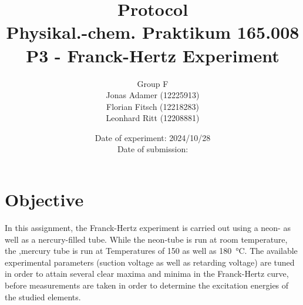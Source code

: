 \documentclass[titlepage]{article}
\title{Protocol \\ Physikal.-chem. Praktikum 165.008 \\ P3 - Franck-Hertz Experiment}
\author{Group F\\Jonas Adamer (12225913)\\Florian Fitsch (12218283)\\Leonhard Ritt (12208881)}
\date{Date of experiment: 2024/10/28\\Date of submission:}
\begin{document}
\maketitle
\thispagestyle{empty}

\newpage
\tableofcontents
\thispagestyle{empty}

\addtocounter{page}{-1}

\newpage
\section{Objective}
In this assignment, the Franck-Hertz experiment is carried out using a neon- as well as a nercury-filled tube. While the neon-tube is run at room temperature, the ,mercury tube is run at Temperatures of 150 as well as 180~°C. The available experimental parameters (suction voltage as well as retarding voltage) are tuned in order to attain several clear maxima and minima in the Franck-Hertz curve, before measurements are taken in order to determine the excitation energies of the studied elements.
\end{document}

